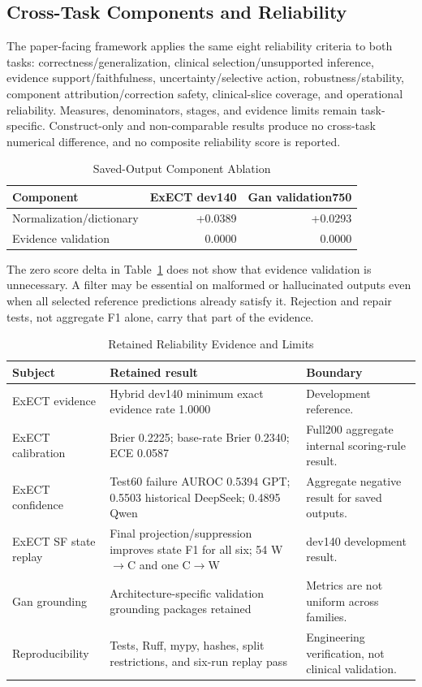 \documentclass[conference]{IEEEtran}
\begin{document}
\subsection{Cross-Task Components and Reliability}

The paper-facing framework applies the same eight reliability criteria to both
tasks: correctness/generalization, clinical selection/unsupported inference,
evidence support/faithfulness, uncertainty/selective action,
robustness/stability, component attribution/correction safety, clinical-slice
coverage, and operational reliability. Measures, denominators, stages, and
evidence limits remain task-specific. Construct-only and non-comparable results
produce no cross-task numerical difference, and no composite reliability score
is reported.

\begin{table}[tbp]
\caption{Saved-Output Component Ablation}
\label{tab:components}
\centering
\scriptsize
\begin{tabular}{lrr}
\toprule
Component & ExECT dev140 & Gan validation750 \\
\midrule
Normalization/dictionary & +0.0389 & +0.0293 \\
Evidence validation & 0.0000 & 0.0000 \\
\bottomrule
\end{tabular}
\end{table}

The zero score delta in Table~\ref{tab:components} does not show that evidence
validation is unnecessary. A filter may be essential on malformed or
hallucinated outputs even when all selected reference predictions already
satisfy it. Rejection and repair tests, not aggregate F1 alone, carry that part
of the evidence.

\begin{table}[!t]
\caption{Retained Reliability Evidence and Limits}
\label{tab:reliability}
\centering
\scriptsize
\begin{tabular}{@{}p{}p{}p{}@{}}
\toprule
Subject & Retained result & Boundary \\
\midrule
ExECT evidence & Hybrid dev140 minimum exact evidence rate 1.0000 & Development reference. \\
ExECT calibration & Brier 0.2225; base-rate Brier 0.2340; ECE 0.0587 & Full200 aggregate internal scoring-rule result. \\
ExECT confidence & Test60 failure AUROC 0.5394 GPT; 0.5503 historical DeepSeek; 0.4895 Qwen & Aggregate negative result for saved outputs. \\
ExECT SF state replay & Final projection/suppression improves state F1 for all six; 54 W$\rightarrow$C and one C$\rightarrow$W & dev140 development result. \\
Gan grounding & Architecture-specific validation grounding packages retained & Metrics are not uniform across families. \\
Reproducibility & Tests, Ruff, mypy, hashes, split restrictions, and six-run replay pass & Engineering verification, not clinical validation. \\
\bottomrule
\end{tabular}
\end{table}
\end{document}
